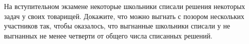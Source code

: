 На вступительном экзамене некоторые школьники списали решения некоторых задач у своих товарищей. Докажите, что можно выгнать
с позором нескольких участников так, чтобы оказалось, что выгнанные школьники списали у не выгнанных не менее четверти от
общего числа списанных решений.
